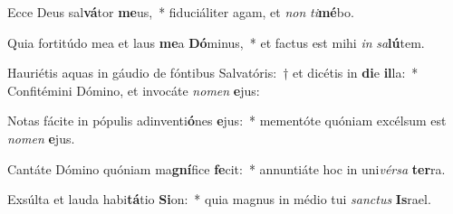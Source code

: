 \item Ecce Deus sal\textbf{vá}tor \textbf{me}us,~* fiduciáliter agam, et \textit{non} \textit{ti}\textbf{mé}bo.
\item Quia fortitúdo mea et laus \textbf{me}a \textbf{Dó}minus,~* et factus est mihi \textit{in} \textit{sa}\textbf{lú}tem.
\item Hauriétis aquas in gáudio de fóntibus Salvatóris:~† et dicétis in \textbf{di}e \textbf{il}la:~* Confitémini Dómino, et invocáte \textit{no}\textit{men} \textbf{e}jus:
\item Notas fácite in pópulis adinventi\textbf{ó}nes \textbf{e}jus:~* mementóte quóniam excélsum est \textit{no}\textit{men} \textbf{e}jus.
\item Cantáte Dómino quóniam ma\textbf{gní}fice \textbf{fe}cit:~* annuntiáte hoc in uni\textit{vér}\textit{sa} \textbf{ter}ra.
\item Exsúlta et lauda habi\textbf{tá}tio \textbf{Si}on:~* quia magnus in médio tui \textit{sanc}\textit{tus} \textbf{Is}rael.
